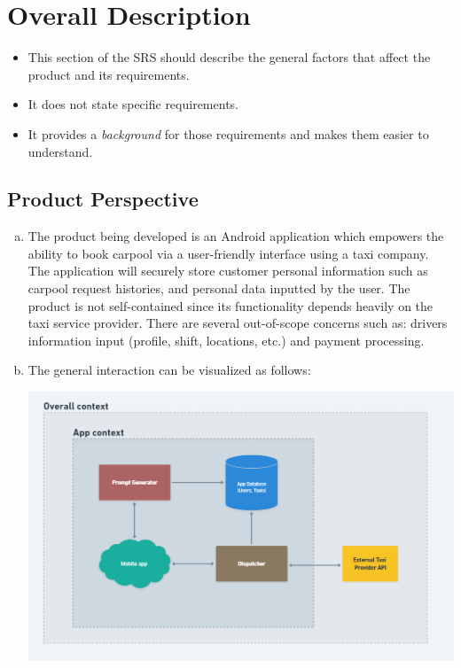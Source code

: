 \documentclass[]{article}
\begin{document}

\section{Overall Description}
\label{sec:overall_description}

\begin{itemize}
	\item This section of the SRS should describe the general factors that affect the product and its requirements. 
	\item It does not state specific requirements.
	\item It provides a \emph{background} for those requirements and makes them easier to understand.
\end{itemize}


\subsection{Product Perspective}
\label{sub:product_perspective}

\begin{enumerate}[a)]
	\item The product being developed is an Android application which empowers the ability to book carpool via a user-friendly interface using a taxi company. The application will securely store customer personal information such as carpool request histories, and personal data inputted by the user. The product is not self-contained since its functionality depends heavily on the taxi service provider. There are several out-of-scope concerns such as: driver\textquotesingle s information input (profile, shift, locations, etc.) and payment processing.
	\item The general interaction can be visualized as follows: 
	\begin{center}
		\includegraphics[scale=0.5]{app-context.png}
	\end{center}
\end{enumerate}
\end{document}
